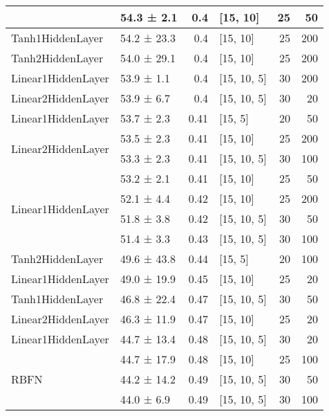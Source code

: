 \begin{table*}[h]
\begin{tabular}{llrlrr}
         & 54.3 ± 2.1  &  0.4  & [15, 10]       &         25 &       50 \\
 \hline
Tanh1HiddenLayer         & 54.2 ± 23.3 &  0.4  & [15, 10]       &         25 &      200 \\
 \hline
Tanh2HiddenLayer         & 54.0 ± 29.1 &  0.4  & [15, 10]       &         25 &      200 \\
 \hline
Linear1HiddenLayer         & 53.9 ± 1.1  &  0.4  & [15, 10, 5]    &         30 &      200 \\
 \hline
Linear2HiddenLayer         & 53.9 ± 6.7  &  0.4  & [15, 10, 5]    &         30 &       20 \\
 \hline
Linear1HiddenLayer         & 53.7 ± 2.3  &  0.41 & [15, 5]        &         20 &       50 \\
 \hline
\multirow{2}{*}{Linear2HiddenLayer}         & 53.5 ± 2.3  &  0.41 & [15, 10]       &         25 &      200 \\
         & 53.3 ± 2.3  &  0.41 & [15, 10, 5]    &         30 &      100 \\
 \hline
\multirow{4}{*}{Linear1HiddenLayer}         & 53.2 ± 2.1  &  0.41 & [15, 10]       &         25 &       50 \\
         & 52.1 ± 4.4  &  0.42 & [15, 10]       &         25 &      200 \\
         & 51.8 ± 3.8  &  0.42 & [15, 10, 5]    &         30 &       50 \\
         & 51.4 ± 3.3  &  0.43 & [15, 10, 5]    &         30 &      100 \\
 \hline
Tanh2HiddenLayer         & 49.6 ± 43.8 &  0.44 & [15, 5]        &         20 &      100 \\
 \hline
Linear1HiddenLayer         & 49.0 ± 19.9 &  0.45 & [15, 10]       &         25 &       20 \\
 \hline
Tanh1HiddenLayer         & 46.8 ± 22.4 &  0.47 & [15, 10, 5]    &         30 &       50 \\
 \hline
Linear2HiddenLayer         & 46.3 ± 11.9 &  0.47 & [15, 10]       &         25 &       20 \\
 \hline
Linear1HiddenLayer         & 44.7 ± 13.4 &  0.48 & [15, 10, 5]    &         30 &       20 \\
 \hline
\multirow{4}{*}{RBFN}         & 44.7 ± 17.9 &  0.48 & [15, 10]       &         25 &      100 \\
         & 44.2 ± 14.2 &  0.49 & [15, 10, 5]    &         30 &       50 \\
         & 44.0 ± 6.9  &  0.49 & [15, 10, 5]    &         30 &      100 \\

\end{tabular}
\end{table*}
